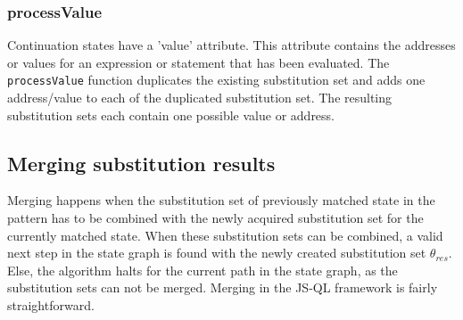 \subsubsection{processValue}
Continuation states have a 'value' attribute. This attribute contains the addresses or values for an expression or statement that has been evaluated. The \texttt{processValue} function duplicates the existing substitution set and adds one address/value to each of the duplicated substitution set. The resulting substitution sets each contain one possible value or address.



\subsection{Merging substitution results}
\label{subsec:merging}

Merging happens when the substitution set of previously matched state in the pattern has to be combined with the newly acquired substitution set for the currently matched state. When these substitution sets can be combined, a valid next step in the state graph is found with the newly created substitution set $\theta_{res}$. Else, the algorithm halts for the current path in the state graph, as the substitution sets can not be merged. Merging in the JS-QL framework is fairly straightforward. 

